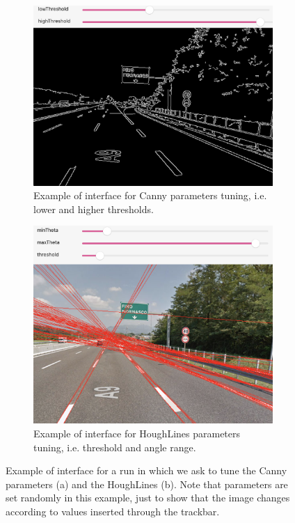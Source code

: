 \documentclass[twoside,onecolumn]{article}
\theoremstyle{definition}
\begin{document}
\begin{figure} \centering
\begin{subfigure}{0.5\textwidth}
  \includegraphics[width=\textwidth]{figs/tuningEdge.png}
\caption{ Example of interface for Canny parameters tuning, i.e. lower and higher thresholds.}\label{fig:tuningedge}
\end{subfigure} \quad
\begin{subfigure}{0.46\textwidth}
\includegraphics[width=\textwidth]{figs/tuningLines.png}
\caption{Example of interface for HoughLines parameters tuning, i.e. threshold and angle range.}\label{fig:tuningline}
\end{subfigure}\caption{Example of interface for a run in which we ask to tune the Canny parameters (a) and the HoughLines (b). Note that parameters are set randomly in this example, just to show that the image changes according to values inserted through the trackbar. }\label{fig:tuning}
\end{figure}
\end{document}
